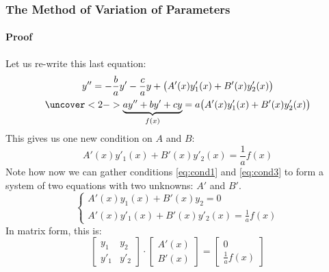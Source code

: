 \documentclass[9pt,xcolor=x11names,compress]{beamer}
\begin{document}
\begin{frame}\frametitle{The Method of Variation of Parameters}
\framesubtitle{Proof}
Let us re-write this last equation:
\begin{gather*}
	y'' = -\frac{b}{a}y'-\frac{c}{a}y + \big( A'(x)y'_1(x)+B'(x)y'_2(x) \big) \\
	\uncover<2->{\underbrace{ay''+by'+cy}_{f(x)} = a\big( A'(x)y'_1(x) + B'(x)y'_2(x) \big)}
\end{gather*}
\pause\pause This gives us one new condition on $A$ and $B$:
\begin{equation}\label{eq:cond3}
	A'(x)y'_1(x) + B'(x)y'_2(x) = \frac{1}{a}f(x)
\end{equation}
\pause Note how now we can gather conditions \eqref{eq:cond1} and \eqref{eq:cond3} to form a system of two equations with two unknowns: $A'$ and $B'$.
\begin{equation*}
	\begin{cases}
		A'(x)y_1(x) + B'(x)y_2 = 0\\
		A'(x)y'_1(x) + B'(x)y'_2(x) = \tfrac{1}{a}f(x)
	\end{cases}
\end{equation*}
\pause In matrix form, this is:
\begin{equation*}
\begin{bmatrix}
y_1 & y_2 \\ y'_1 & y'_2
\end{bmatrix} \cdot
\begin{bmatrix}
A'(x) \\ B'(x)
\end{bmatrix} =
\begin{bmatrix}
0 \\ \tfrac{1}{a}f(x)
\end{bmatrix}
\end{equation*}
\end{frame}
\end{document}
